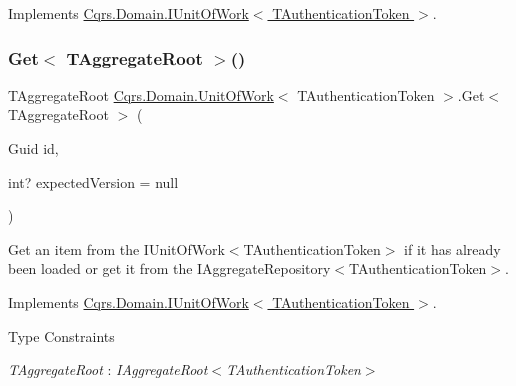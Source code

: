 Implements \hyperlink{interfaceCqrs_1_1Domain_1_1IUnitOfWork_ade600c9bf9e8380c24eaf1e7e0df6e01_ade600c9bf9e8380c24eaf1e7e0df6e01}{Cqrs.\+Domain.\+I\+Unit\+Of\+Work$<$ T\+Authentication\+Token $>$}.

\mbox{\label{classCqrs_1_1Domain_1_1UnitOfWork_a1e953136c916aee711068813078aed05_a1e953136c916aee711068813078aed05}} 
\subsubsection{\texorpdfstring{Get$<$ T\+Aggregate\+Root $>$()}{Get< TAggregateRoot >()}}
{\footnotesize\ttfamily T\+Aggregate\+Root \hyperlink{classCqrs_1_1Domain_1_1UnitOfWork}{Cqrs.\+Domain.\+Unit\+Of\+Work}$<$ T\+Authentication\+Token $>$.Get$<$ T\+Aggregate\+Root $>$ (\begin{DoxyParamCaption}\item[{Guid}]{id,  }\item[{int?}]{expected\+Version = {\ttfamily null} }\end{DoxyParamCaption})}



Get an item from the I\+Unit\+Of\+Work$<$\+T\+Authentication\+Token$>$ if it has already been loaded or get it from the I\+Aggregate\+Repository$<$\+T\+Authentication\+Token$>$. 



Implements \hyperlink{interfaceCqrs_1_1Domain_1_1IUnitOfWork_aad3e9f94cbe6941163feb9fe00ddbe06_aad3e9f94cbe6941163feb9fe00ddbe06}{Cqrs.\+Domain.\+I\+Unit\+Of\+Work$<$ T\+Authentication\+Token $>$}.

\begin{Desc}
\item[Type Constraints]\begin{description}
\item[{\em T\+Aggregate\+Root} : {\em I\+Aggregate\+Root$<$T\+Authentication\+Token$>$}]\end{description}
\end{Desc}
